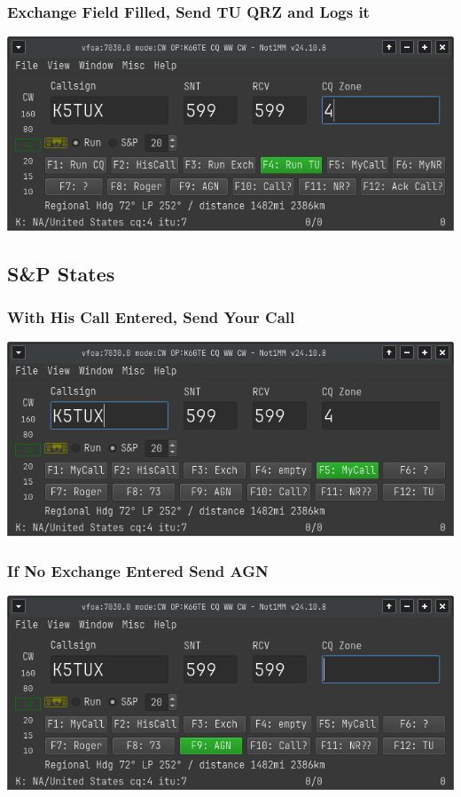 \documentclass{article}
\begin{document}
\subsubsection{Exchange Field Filled, Send TU QRZ and Logs it}

\vspace{0.5cm}
\includegraphics[width=0.75\linewidth]{pic/esm_qrz.png}

\subsection{S\&P States}

\subsubsection{With His Call Entered, Send Your Call}

\vspace{0.5cm}
\includegraphics[width=0.75\linewidth]{pic/esm_sp_call.png}

\subsubsection{If No Exchange Entered Send AGN}

\vspace{0.5cm}
\includegraphics[width=0.75\linewidth]{pic/esm_sp_agn.png}
\end{document}
